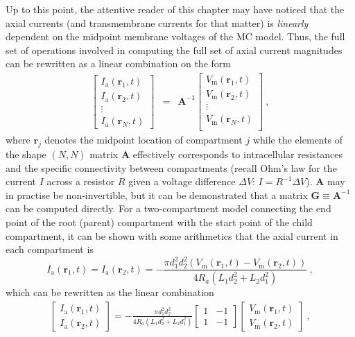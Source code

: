 Up to this point, the attentive reader of this chapter may have noticed that the axial currents (and transmembrane currents for that matter) is \textit{linearly} dependent on the midpoint membrane voltages of the MC model.
Thus, the full set of operations involved in computing the full set of axial current magnitudes can be rewritten as a linear combination on the form
%
\begin{eqnarray}
\begin{bmatrix}
I_\mathrm{a}(\mathbf{r}_1, t)\\
I_\mathrm{a}(\mathbf{r}_2, t)\\
\vdots \\
I_\mathrm{a}(\mathbf{r}_N, t)
\end{bmatrix}
&=& \mathbf{A}^{-1}
\begin{bmatrix}
V_\mathrm{m}(\mathbf{r}_1, t)\\
V_\mathrm{m}(\mathbf{r}_2, t)\\
\vdots \\
V_\mathrm{m}(\mathbf{r}_N, t)\\
\end{bmatrix} ~,
\label{eq:LFPy_linear_combination}
\end{eqnarray}
%
where $\mathbf{r}_j$ denotes the midpoint location of compartment $j$ while the elements of the shape $(N, N)$ matrix $\mathbf{A}$ effectively corresponds to intracellular resistances and the specific connectivity between compartments
(recall Ohm's law for the current $I$ across a resistor $R$ given a voltage difference $\Delta V$: $I=R^{-1} \Delta V$).
$\mathbf{A}$ may in practise be non-invertible,
but it can be demonstrated that a matrix $\mathbf{G}\equiv \mathbf{A}^{-1}$ can be computed directly.
%
For a two-compartment model connecting the end point of the root (parent) compartment with the start point of the child compartment,
it can be shown with some arithmetics that the axial current in each compartment is 
%
\begin{equation}
I_\mathrm{a}(\mathbf{r}_1, t) = I_\mathrm{a}(\mathbf{r}_2, t) =
	- \frac{\pi d_{1}^{2} d_{2}^{2} \left(V_\mathrm{m}(\mathbf{r}_1, t) - V_\mathrm{m}(\mathbf{r}_2, t) \right)}{4 R_{a} \left(L_{1} d_{2}^{2} + L_{2} d_{1}^{2}\right)} ~,
\end{equation}
%
which can be rewritten as the linear combination
%
\begin{eqnarray}
\begin{bmatrix}
I_\mathrm{a}(\mathbf{r}_1, t)\\
I_\mathrm{a}(\mathbf{r}_2, t)
\end{bmatrix}
=
- \frac{\pi d_{1}^{2} d_{2}^{2}}{4 R_{a} \left(L_{1} d_{2}^{2} + L_{2} d_{1}^{2}\right)}
\begin{bmatrix}
1 & -1 \\
1 & -1
\end{bmatrix}
\begin{bmatrix}
V_\mathrm{m}(\mathbf{r}_1, t) \\
V_\mathrm{m}(\mathbf{r}_2, t)
\end{bmatrix} ~,
\end{eqnarray}
